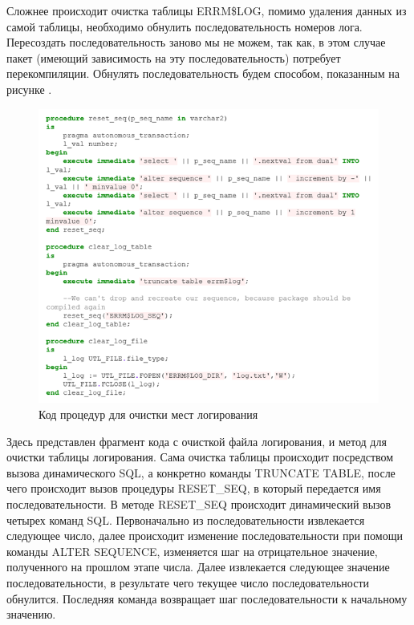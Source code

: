 Сложнее происходит очистка таблицы ERRM\$LOG, помимо удаления данных из самой таблицы, необходимо обнулить последовательность номеров лога. Пересоздать последовательность заново мы не можем, так как, в этом случае пакет (имеющий зависимость на эту последовательность) потребует перекомпиляции. Обнулять последовательность будем способом, показанным на рисунке . 

\begin{figure}[ht!] 
	\center
	\includegraphics [scale=1] {my_folder/img/c3_clear_code.png}
	\caption{Код процедур для очистки мест логирования} 
	\label{fig:c3_clear_code}  
\end{figure}
\FloatBarrier

Здесь представлен фрагмент кода с очисткой файла логирования, и метод для очистки таблицы логирования. Сама очистка таблицы происходит посредством вызова динамического SQL, а конкретно команды TRUNCATE TABLE, после чего происходит вызов процедуры RESET\_SEQ, в который передается имя последовательности. 
В методе RESET\_SEQ происходит динамический вызов четырех команд SQL. Первоначально из последовательности извлекается следующее число, далее происходит изменение последовательности при помощи команды ALTER SEQUENCE, изменяется шаг на отрицательное значение, полученного на прошлом этапе числа. Далее извлекается следующее значение последовательности, в результате чего текущее число последовательности обнулится. Последняя команда возвращает шаг последовательности к начальному значению. 


